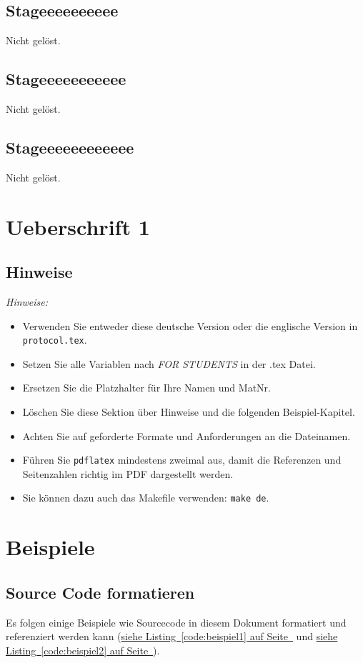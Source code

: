 \documentclass[12pt,a4paper,titlepage,oneside]{scrartcl}
\begin{document}
\subsection{Stageeeeeeeeee}
Nicht gelöst.

\subsection{Stageeeeeeeeeee}
Nicht gelöst.

\subsection{Stageeeeeeeeeeee}
Nicht gelöst.


\section{Ueberschrift 1}

\subsection{Hinweise}
\emph{Hinweise:}
\begin{itemize}
    \item Verwenden Sie entweder diese deutsche Version oder die englische Version in \lstinline{protocol.tex}.
    \item Setzen Sie alle Variablen nach \emph{FOR STUDENTS} in der .tex Datei.
    \item Ersetzen Sie die Platzhalter für Ihre Namen und MatNr.
    \item Löschen Sie diese Sektion über Hinweise und die folgenden Beispiel-Kapitel.
    \item Achten Sie auf geforderte Formate und Anforderungen an die Dateinamen.
    \item Führen Sie \lstinline{pdflatex} mindestens zweimal aus, damit die Referenzen und Seitenzahlen richtig im PDF dargestellt werden.
    \item Sie können dazu auch das Makefile verwenden: \lstinline{make de}.
\end{itemize}

\section{Beispiele}

\subsection{Source Code formatieren}
Es folgen einige Beispiele wie Sourcecode in diesem Dokument formatiert und referenziert werden kann
(\hyperref[code:beispiel1]{siehe Listing~\ref*{code:beispiel1} auf Seite~\pageref*{code:beispiel1}} und \hyperref[code:beispiel2]{siehe Listing~\ref*{code:beispiel2} auf Seite~\pageref*{code:beispiel2}}).
\end{document}
